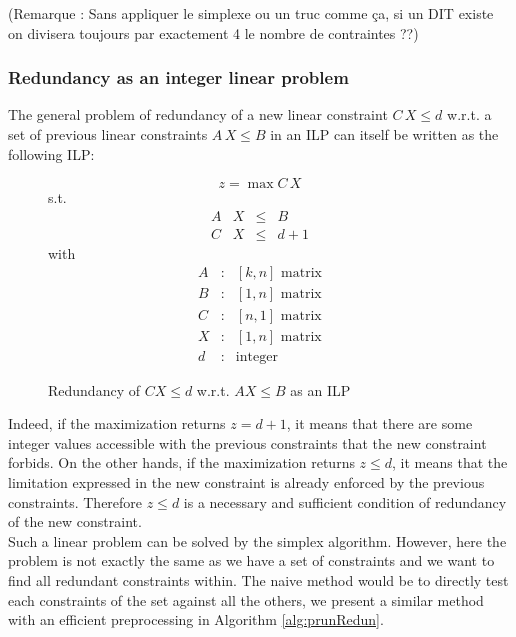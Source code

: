\documentclass[times, 10pt,twocolumn, a4paper]{article}
\begin{document}
(Remarque : Sans appliquer le simplexe ou un truc comme ça, si un DIT existe on divisera toujours par exactement 4 le nombre de contraintes ??)

\subsubsection{Redundancy as an integer linear problem}

The general problem of redundancy of a new linear constraint $C \, X \leq d$ w.r.t. a set of previous linear constraints $A \, X \leq B$ in an ILP can itself be written as the following ILP:

\begin{figure}[h]
$$z = \max C \, X$$
s.t.
\[
\begin{array}{rccc}
	A & X &\leq & B \\
	C & X &\leq & d + 1
\end{array}
\]
with
\[
	\begin{array}{ccc}
		A & : & [k,n] \text{ matrix}\\
		B & : & [1,n] \text{ matrix}\\
		C & : & [n,1] \text{ matrix}\\
		X & : & [1,n] \text{ matrix}\\
		d & : & \text{integer}
	\end{array}
\]
\caption{Redundancy of $CX \leq d$ w.r.t. $A X \leq B$ as an ILP}
\end{figure}

Indeed, if the maximization returns $z=d+1$, it means that there are some integer values accessible with the previous constraints that the new constraint forbids. On the other hands, if the maximization returns $z \leq d$, it means that the limitation expressed in the new constraint is already enforced by the previous constraints. Therefore $z \leq d$ is a necessary and sufficient condition of redundancy of the new constraint.\\

Such a linear problem can be solved by the simplex algorithm. However, here the problem is not exactly the same as we have a set of constraints and we want to find all redundant constraints within. The naive method would be to directly test each constraints of the set against all the others, we present a similar method with an efficient preprocessing in Algorithm \ref{alg:prunRedun}.\\
\end{document}
